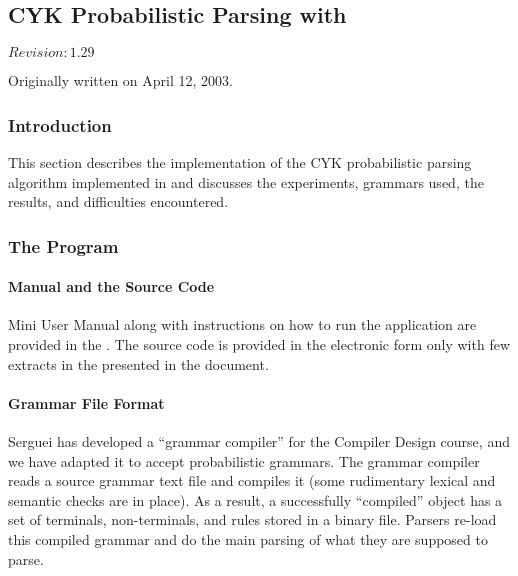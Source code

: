 %
%

\subsection{CYK Probabilistic Parsing with }

$Revision: 1.29 $

Originally written on April 12, 2003.

\subsubsection{Introduction}

This section describes the implementation of the CYK probabilistic parsing
algorithm \cite{cyk} implemented in {\java} and discusses the experiments, grammars used,
the results, and difficulties encountered.

\subsubsection{The Program}

\paragraph{Manual and the Source Code}

Mini User Manual along with instructions on how to run the application are provided
in the . The source code is provided in the electronic form only with few extracts
in the presented in the document.

\paragraph{Grammar File Format}

Serguei has developed a ``grammar compiler'' for the Compiler Design course, and
we have adapted it to accept probabilistic grammars. The grammar compiler reads a source
grammar text file and compiles it (some rudimentary lexical and semantic checks are in place).
As a result, a successfully ``compiled''  object
has a set of terminals, non-terminals, and rules stored in a binary file.
Parsers re-load this compiled grammar and do the main parsing of what they are supposed to parse.


